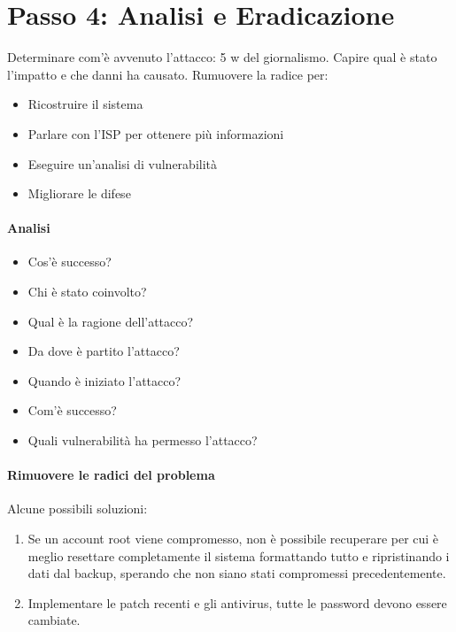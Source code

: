 \section*{Passo 4: Analisi e Eradicazione}

Determinare com'è avvenuto l'attacco: 5 w del giornalismo. Capire qual è stato 
l'impatto e che danni ha causato. Rumuovere la radice per:

\begin{itemize}
\item Ricostruire il sistema
\item Parlare con l'ISP per ottenere più informazioni
\item Eseguire un'analisi di vulnerabilità
\item Migliorare le difese 
\end{itemize}


\paragraph*{Analisi}

\begin{itemize}
\item Cos'è successo?
\item Chi è stato coinvolto?
\item Qual è la ragione dell'attacco?
\item Da dove è partito l'attacco?
\item Quando è iniziato l'attacco?
\item Com'è successo?
\item Quali vulnerabilità ha permesso l'attacco?
\end{itemize}


\paragraph*{Rimuovere le radici del problema}

Alcune possibili soluzioni:
\begin{enumerate}
\item Se un account root viene compromesso, non è possibile recuperare per cui è 
meglio resettare completamente il sistema formattando tutto e ripristinando i 
dati dal backup, sperando che non siano stati compromessi precedentemente.
\item Implementare le patch recenti e gli antivirus, tutte le password devono 
essere cambiate.
\end{enumerate}


